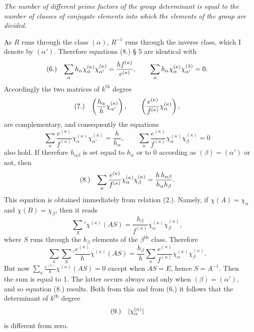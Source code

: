 \documentclass[11pt]{article}
\makeatletter
\newcommand{\frobtag}[2]{\[\begin{array}{@{}r@{\quad}l@{}}\textup{(#1)} & \displaystyle #2\end{array}\]}
\newcommand{\frobtagc}[2]{\[\begin{array}{@{}r@{\quad}c@{}}\textup{(#1)} & \displaystyle #2\end{array}\]}
\makeatother
\begin{document}
\emph{The number of different prime factors of the group determinant is equal to the number of classes of conjugate elements into which the elements of the group are divided.}

As $R$ runs through the class $(\alpha)$, $R^{-1}$ runs through the inverse class, which I denote by $(\alpha')$. Therefore equations (8.) § 5 are identical with
\frobtag{6.}{\sum_\alpha h_\alpha\chi_\alpha^{(\kappa)}\chi_{\alpha'}^{(\kappa)}=\frac{h f^{(\kappa)}}{e^{(\kappa)}},\qquad \sum_\alpha h_\alpha\chi_\alpha^{(\kappa)}\chi_{\alpha'}^{(\lambda)}=0.}
Accordingly the two matrices of $k^{\mathrm{th}}$ degree
\frobtagc{7.}{\left(\frac{h_\alpha}{h}\chi_{\alpha'}^{(\kappa)}\right),\qquad \left(\frac{e^{(\kappa)}}{f^{(\kappa)}}\chi_\alpha^{(\kappa)}\right),}
are complementary, and consequently the equations
\[
\sum_\kappa\frac{e^{(\kappa)}}{f^{(\kappa)}}\chi_\alpha^{(\kappa)}\chi_{\alpha'}^{(\kappa)}=\frac{h}{h_\alpha},\qquad \sum_\kappa\frac{e^{(\kappa)}}{f^{(\kappa)}}\chi_\alpha^{(\kappa)}\chi_\beta^{(\kappa)}=0
\]
also hold. If therefore $h_{\alpha\beta}$ is set equal to $h_\alpha$ or to 0 according as $(\beta)=(\alpha')$ or not, then
\frobtagc{8.}{\sum_\kappa\frac{e^{(\kappa)}}{f^{(\kappa)}}\chi_\alpha^{(\kappa)}\chi_\beta^{(\kappa)}=\frac{h\,h_{\alpha\beta}}{h_\alpha h_\beta}.}
This equation is obtained immediately from relation (2.). Namely, if $\chi(A)=\chi_\alpha$ and $\chi(B)=\chi_\beta$, then it reads
\[
\sum_S'\chi^{(\kappa)}(AS)=\frac{h_\beta}{f^{(\kappa)}}\chi_\alpha^{(\kappa)}\chi_\beta^{(\kappa)},
\]
where $S$ runs through the $h_\beta$ elements of the $\beta^{\mathrm{th}}$ class. Therefore
\[
\sum_\kappa\sum_S'\frac{e^{(\kappa)}}{h}\chi^{(\kappa)}(AS)=\frac{h_\beta}{h}\sum_\kappa\frac{e^{(\kappa)}}{f^{(\kappa)}}\chi_\alpha^{(\kappa)}\chi_\beta^{(\kappa)}.
\]
But now $\sum_\kappa\frac{e^{(\kappa)}}{h}\chi^{(\kappa)}(AS)=0$ except when $AS=E$, hence $S=A^{-1}$. Then the sum is equal to 1. The latter occurs always and only when $(\beta)=(\alpha')$, and so equation (8.) results. Both from this and from (6.) it follows that the determinant of $k^{\mathrm{th}}$ degree
\frobtagc{9.}{|\chi_\alpha^{(\kappa)}|}
is different from zero.
\end{document}
